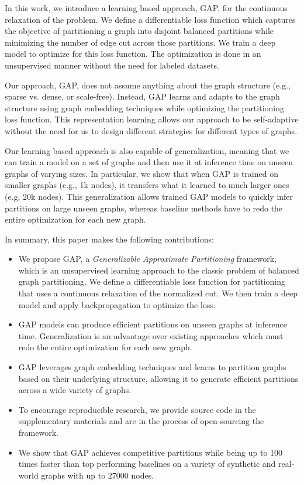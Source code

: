 \documentclass[10pt,twocolumn]{article}
\begin{document}
In this work, we introduce a learning based approach, GAP, for the continuous relaxation of the problem. We define a differentiable loss function which captures the objective of partitioning a graph into disjoint balanced partitions while minimizing the number of edge cut across those partitions. We train a deep model to optimize for this loss function. The optimization is done in an unsupervised manner without the need for labeled datasets.

Our approach, GAP, does not assume anything about the graph structure (e.g., sparse vs. dense, or scale-free). Instead, GAP learns and adapts to the graph structure using graph embedding techniques while optimizing the partitioning loss function. This representation learning allows our approach to be self-adaptive without the need for us to design different strategies for different types of graphs.


Our learning based approach is also capable of generalization, meaning that we can train a model on a set of graphs and then use it at inference time on unseen graphs of varying sizes. In particular, we show that when GAP is trained on smaller graphs (e.g., 1k nodes), it transfers what it learned to much larger ones (e.g, 20k nodes). This generalization allows trained GAP models to quickly infer partitions on large unseen graphs, whereas baseline methods have to redo the entire optimization for each new graph. 

In summary, this paper makes the following contributions:
\begin{itemize}[leftmargin=*]
    \item We propose GAP, a {\it Generalizable Approximate Partitioning} framework, which is an unsupervised learning approach to the classic problem of balanced graph partitioning. We define a differentiable loss function for partitioning that uses a continuous relaxation of the normalized cut. We then train a deep model and apply backpropagation to optimize the loss.
\item GAP models can produce efficient partitions on unseen graphs at inference time. Generalization is an advantage over existing approaches which must redo the entire optimization for each new graph.
\item GAP leverages graph embedding techniques \cite{kipf2017semi, HamiltonYL17} and learns to partition graphs based on their underlying structure, allowing it to generate efficient partitions across a wide variety of graphs.
\item To encourage reproducible research, we provide source code in the supplementary materials and are in the process of open-sourcing the framework.
\item We show that GAP achieves competitive partitions while being up to 100 times faster than top performing baselines on a variety of synthetic and real-world graphs with up to 27000 nodes. 
\end{itemize}
\end{document}
